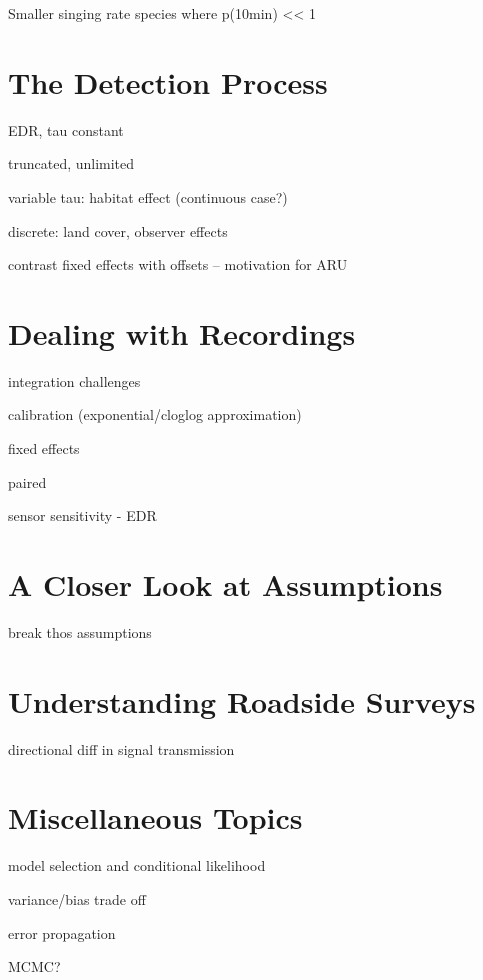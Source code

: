 \documentclass[12pt,]{book}
\begin{document}
Smaller singing rate species where p(10min) \textless{}\textless{} 1

\hypertarget{detection}{%
\chapter{The Detection Process}\label{detection}}

EDR, tau constant

truncated, unlimited

variable tau: habitat effect (continuous case?)

discrete: land cover, observer effects

contrast fixed effects with offsets -- motivation for ARU

\hypertarget{recordings}{%
\chapter{Dealing with Recordings}\label{recordings}}

integration challenges

calibration (exponential/cloglog approximation)

fixed effects

paired

sensor sensitivity - EDR

\hypertarget{assumptions}{%
\chapter{A Closer Look at Assumptions}\label{assumptions}}

break thos assumptions

\hypertarget{roadsides}{%
\chapter{Understanding Roadside Surveys}\label{roadsides}}

directional diff in signal transmission

\hypertarget{extras}{%
\chapter{Miscellaneous Topics}\label{extras}}

model selection and conditional likelihood

variance/bias trade off

error propagation

MCMC?
\end{document}
